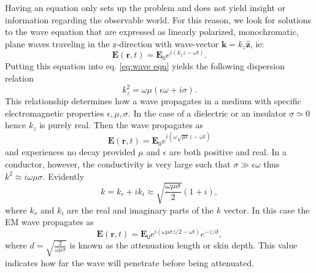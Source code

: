 Having an equation only sets up the problem and does not yield insight or information regarding the observable world. For this reason, we look for solutions to the wave equation that are expressed as linearly polarized, monochromatic, plane waves traveling in the z-direction with wave-vector $\mathbf{k}=k_z \mathbf{\hat{z}}$, ie:
\begin{equation}
\mathbf{E}(\mathbf{r},t)=\mathbf{E}_0 e^{i(k_z z- \omega t)}.
\label{eq:E plane wave}
\end{equation}
Putting this equation into eq. \eqref{eq:wave eqn} yields the following dispersion relation
\begin{equation}
k^2_z=\omega \mu(\epsilon \omega + i \sigma).
\label{eq:gen. dispersion}
\end{equation}
This relationship determines how a wave propagates in a medium with specific electromagnetic properties $\epsilon, \mu, \sigma$. In the case of a dielectric or an insulator $\sigma \simeq 0$ hence $k_z$ is purely real. Then the wave propagates as
\begin{equation}
\mathbf{E}(\mathbf{r},t)=\mathbf{E}_0 e^{i(\omega \sqrt{\mu \epsilon} z- \omega t)}
\label{eq:real propagation}
\end{equation}
and experiences no decay provided $\mu$ and $\epsilon$ are both positive and real. In a conductor, however, the conductivity is very large such that $\sigma \gg \epsilon \omega$ thus $k^2 \approx i \omega \mu \sigma$. Evidently
\begin{equation}
k=k_r+i k_i \approx \sqrt{\frac{\omega \mu \sigma}{2}}(1+i),
\label{eq:k conductor}
\end{equation}
where $k_r$ and $k_i$ are the real and imaginary parts of the $k$ vector. In this case the EM wave propagates as
\begin{equation}
\mathbf{E}(\mathbf{r},t)=\mathbf{E}_0 e^{i(\omega \mu \sigma z/2- \omega t)}e^{-z/d},
\label{eq:real propagation}
\end{equation}
where $d=\sqrt{\frac{2}{\omega \mu \sigma}}$ is known as the attenuation length or skin depth. This value indicates how far the wave will penetrate before being attenuated.



